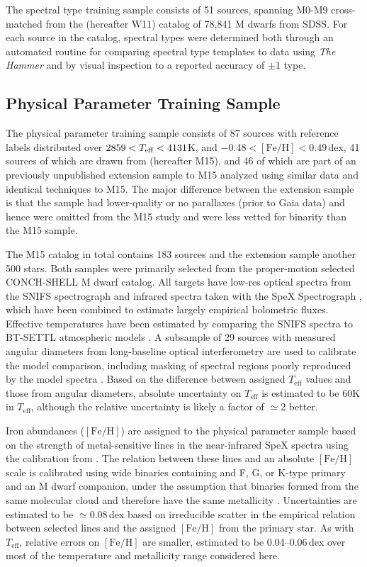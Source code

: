 \documentclass[twocolumn]{aastex62}
\newcommand{\teff}{T_{\mathrm{eff}}}
\newcommand{\feh}{[{\mathrm{Fe}/\mathrm{H}}]}
\begin{document}
The spectral type training sample consists of 51 sources, spanning M0-M9 cross-matched from the \citet{West:2011} (hereafter W11) catalog of 78,841 M dwarfs from SDSS. For each source in the catalog, spectral types were determined both through an automated routine for comparing spectral type templates to data using \textsl{The Hammer} \citep{Covey:2007} and by visual inspection to a reported accuracy of $\pm$1 type.

\subsection{Physical Parameter Training Sample}

The physical parameter training sample consists of 87 sources with reference labels distributed over $2859 <T_{\rm eff} < 4131$K, and $-0.48 < \feh < 0.49$\,dex, 41 sources of which are drawn from \citet{Mann:2015} (hereafter M15), and 46 of which are part of an previously unpublished extension sample to M15 analyzed using similar data and identical techniques to M15. The major difference between the extension sample is that the sample had lower-quality or no parallaxes (prior to Gaia data) and hence were omitted from the M15 study and were less vetted for binarity than the M15 sample.

The M15 catalog in total contains 183 sources and the extension sample another 500 stars. Both samples were primarily selected from the proper-motion selected CONCH-SHELL \citep{Gaidos:2013} M dwarf catalog. All targets have low-res optical spectra from the SNIFS spectrograph \citep{Lantz:2004} and infrared spectra taken with the SpeX Spectrograph \citep{Rayner:2003}, which have been combined to estimate largely empirical bolometric fluxes. Effective temperatures have been estimated by comparing the SNIFS spectra to BT-SETTL atmospheric models \citep{Allard:2011}. A subsample of 29 sources with measured angular diameters from long-baseline optical interferometry \citep{Boyajian:2012} are used to calibrate the model comparison, including masking of spectral regions poorly reproduced by the model spectra \citep{Mann:2013c}. Based on the difference between assigned $\teff$ values and those from angular diameters, absolute uncertainty on $\teff$ is estimated to be 60K in $\teff$, although the relative uncertainty is likely a factor of $\simeq$2 better.

Iron abundances ($\feh$) are assigned to the physical parameter sample based on the strength of metal-sensitive lines in the near-infrared SpeX spectra \citep{RojasAyala:2010} using the calibration from \citet{Mann:2013a}. The relation between these lines and an absolute $\feh$ scale is calibrated using wide binaries containing and F, G, or K-type primary and an M dwarf companion, under the assumption that binaries formed from the same molecular cloud and therefore have the same metallicity \citep{Bonfils:2005}. Uncertainties are estimated to be $\simeq$0.08\,dex based on irreducible scatter in the empirical relation between selected lines and the assigned $\feh$ from the primary star. As with $\teff$, relative errors on $\feh$ are smaller, estimated to be 0.04--0.06\,dex over most of the temperature and metallicity range considered here.
\end{document}
